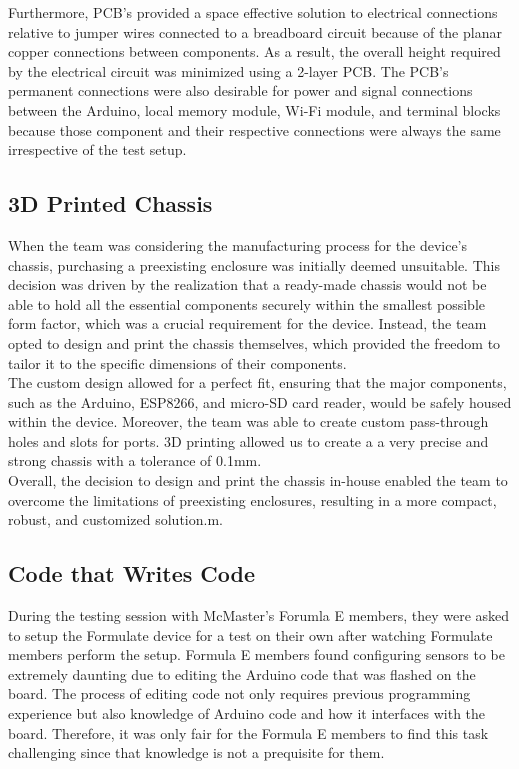 \documentclass[12pt,titlepage]{article}
\begin{document}
Furthermore, PCB's provided a space effective solution to electrical connections relative to jumper wires connected to a breadboard circuit because of the planar copper connections between components. As a result, the overall height required by the electrical circuit was minimized using a 2-layer PCB. The PCB's permanent connections were also desirable for power and signal connections between the Arduino, local memory module, Wi-Fi module, and terminal blocks because those component and their respective connections were always the same irrespective of the test setup. \\

\subsection{3D Printed Chassis}
When the team was considering the manufacturing process for the device's chassis, purchasing a preexisting enclosure was initially deemed unsuitable. This decision was driven by the realization that a ready-made chassis would not be able to hold all the essential components securely within the smallest possible form factor, which was a crucial requirement for the device. Instead, the team opted to design and print the chassis themselves, which provided the freedom to tailor it to the specific dimensions of their components.\\

The custom design allowed for a perfect fit, ensuring that the major components, such as the Arduino, ESP8266, and micro-SD card reader, would be safely housed within the device. Moreover, the team was able to create custom pass-through holes and slots for ports. 3D printing allowed us to create a a very precise and strong chassis with a tolerance of 0.1mm.\\

Overall, the decision to design and print the chassis in-house enabled the team to overcome the limitations of preexisting enclosures, resulting in a more compact, robust, and customized solution.m.

\subsection{Code that Writes Code}
During the testing session with McMaster's Forumla E members, they were asked to setup the Formulate device for a test on their own after watching Formulate
members perform the setup. Formula E members found configuring sensors to be extremely daunting due to editing the Arduino code that was flashed on the board.
The process of editing code not only requires previous programming experience but also knowledge of Arduino code and how it interfaces with the board. Therefore,
it was only fair for the Formula E members to find this task challenging since that knowledge is not a prequisite for them. \\
\end{document}
